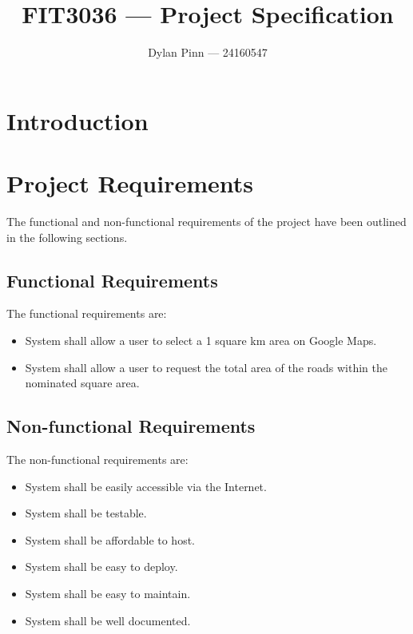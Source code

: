 \documentclass[a4paper,11pt]{article}
\begin{document}
\title{FIT3036 --- Project Specification}
\author{Dylan Pinn --- 24160547}
\maketitle
\pagebreak

\tableofcontents
\pagebreak

\section{Introduction}





\section{Project Requirements}

The functional and non-functional requirements of the project have been outlined
in the following sections.

\subsection{Functional Requirements}

The functional requirements are:

\begin{itemize}
  \item System shall allow a user to select a 1 square km area on Google Maps.
  \item System shall allow a user to request the total area of the roads within
    the nominated square area.
\end{itemize}

\subsection{Non-functional Requirements}

The non-functional requirements are:

\begin{itemize}
  \item System shall be easily accessible via the Internet.
  \item System shall be testable.
  \item System shall be affordable to host.
  \item System shall be easy to deploy.
  \item System shall be easy to maintain.
  \item System shall be well documented.
\end{itemize}
\end{document}
